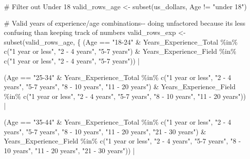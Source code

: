 \documentclass[
  letterpaper,
  DIV=11,
  numbers=noendperiod]{scrartcl}
\newenvironment{Shaded}{\begin{snugshade}}{\end{snugshade}}
\newcommand{\CommentTok}[1]{\textcolor[rgb]{0.37,0.37,0.37}{#1}}
\newcommand{\FunctionTok}[1]{\textcolor[rgb]{0.28,0.35,0.67}{#1}}
\newcommand{\NormalTok}[1]{\textcolor[rgb]{0.00,0.23,0.31}{#1}}
\newcommand{\OtherTok}[1]{\textcolor[rgb]{0.00,0.23,0.31}{#1}}
\newcommand{\SpecialCharTok}[1]{\textcolor[rgb]{0.37,0.37,0.37}{#1}}
\newcommand{\StringTok}[1]{\textcolor[rgb]{0.13,0.47,0.30}{#1}}
\begin{document}
\begin{Shaded}
\begin{Highlighting}[]
\CommentTok{\# Filter out Under 18}
\NormalTok{valid\_rows\_age }\OtherTok{\textless{}{-}} \FunctionTok{subset}\NormalTok{(us\_dollars, }
\NormalTok{                     Age }\SpecialCharTok{!=} \StringTok{"under 18"}\NormalTok{)}

\CommentTok{\# Valid years of experience/age combinations{-}{-} doing unfactored because it\textquotesingle{}s less confusing than keeping track of numbers}
\NormalTok{valid\_rows\_exp }\OtherTok{\textless{}{-}} \FunctionTok{subset}\NormalTok{(valid\_rows\_age, \{}
\NormalTok{  (Age }\SpecialCharTok{==} \StringTok{"18{-}24"} \SpecialCharTok{\&}\NormalTok{ Years\_Experience\_Total }\SpecialCharTok{\%in\%} \FunctionTok{c}\NormalTok{(}\StringTok{"1 year or less"}\NormalTok{, }\StringTok{"2 {-} 4 years"}\NormalTok{, }\StringTok{"5{-}7 years"}\NormalTok{) }\SpecialCharTok{\&}\NormalTok{ Years\_Experience\_Field }\SpecialCharTok{\%in\%} \FunctionTok{c}\NormalTok{(}\StringTok{"1 year or less"}\NormalTok{, }\StringTok{"2 {-} 4 years"}\NormalTok{, }\StringTok{"5{-}7 years"}\NormalTok{)) }\SpecialCharTok{|}
    
\NormalTok{    (Age }\SpecialCharTok{==} \StringTok{"25{-}34"} \SpecialCharTok{\&}\NormalTok{ Years\_Experience\_Total }\SpecialCharTok{\%in\%} \FunctionTok{c}\NormalTok{(}\StringTok{"1 year or less"}\NormalTok{, }\StringTok{"2 {-} 4 years"}\NormalTok{, }\StringTok{"5{-}7 years"}\NormalTok{, }\StringTok{"8 {-} 10 years"}\NormalTok{, }\StringTok{"11 {-} 20 years"}\NormalTok{) }\SpecialCharTok{\&}
\NormalTok{     Years\_Experience\_Field }\SpecialCharTok{\%in\%} \FunctionTok{c}\NormalTok{(}\StringTok{"1 year or less"}\NormalTok{, }\StringTok{"2 {-} 4 years"}\NormalTok{, }\StringTok{"5{-}7 years"}\NormalTok{, }\StringTok{"8 {-} 10 years"}\NormalTok{, }\StringTok{"11 {-} 20 years"}\NormalTok{)) }\SpecialCharTok{|}
    
\NormalTok{  (Age }\SpecialCharTok{==} \StringTok{"35{-}44"} \SpecialCharTok{\&}\NormalTok{ Years\_Experience\_Total }\SpecialCharTok{\%in\%} \FunctionTok{c}\NormalTok{(}\StringTok{"1 year or less"}\NormalTok{, }\StringTok{"2 {-} 4 years"}\NormalTok{, }\StringTok{"5{-}7 years"}\NormalTok{, }\StringTok{"8 {-} 10 years"}\NormalTok{, }\StringTok{"11 {-} 20 years"}\NormalTok{, }\StringTok{"21 {-} 30 years"}\NormalTok{) }\SpecialCharTok{\&}
\NormalTok{     Years\_Experience\_Field }\SpecialCharTok{\%in\%} \FunctionTok{c}\NormalTok{(}\StringTok{"1 year or less"}\NormalTok{, }\StringTok{"2 {-} 4 years"}\NormalTok{, }\StringTok{"5{-}7 years"}\NormalTok{, }\StringTok{"8 {-} 10 years"}\NormalTok{, }\StringTok{"11 {-} 20 years"}\NormalTok{, }\StringTok{"21 {-} 30 years"}\NormalTok{)) }\SpecialCharTok{|}
    

\end{Highlighting}
\end{Shaded}
\end{document}
